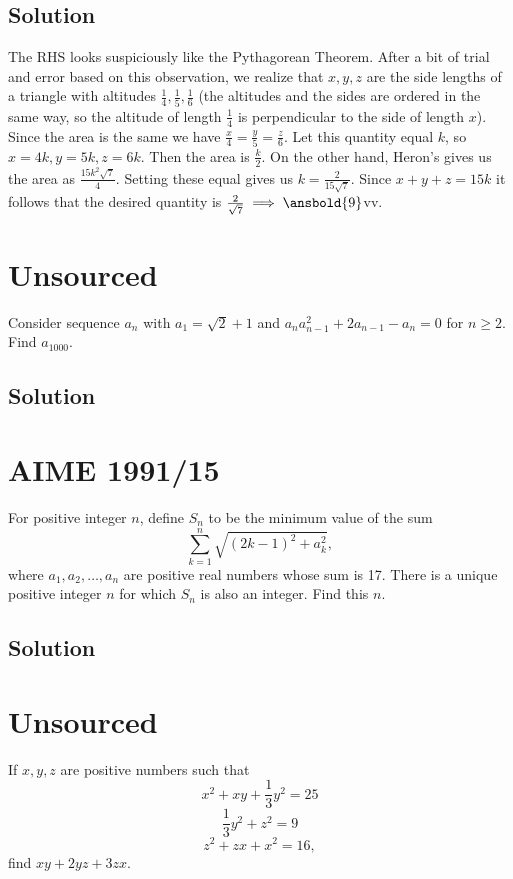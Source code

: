 \documentclass{article}
\begin{document}
\subsection{Solution}
The RHS looks suspiciously like the Pythagorean Theorem. After a bit of trial and error based on this observation, we realize that $x,y,z$ are the side lengths of a triangle with altitudes $\frac{1}{4},\frac{1}{5},\frac{1}{6}$ (the altitudes and the sides are ordered in the same way, so the altitude of length $\frac{1}{4}$ is perpendicular to the side of length $x$). Since the area is the same we have $\frac{x}{4}=\frac{y}{5}=\frac{z}{6}$. Let this quantity equal $k$, so $x=4k,y=5k,z=6k$. Then the area is $\frac{k}{2}$. On the other hand, Heron's gives us the area as $\frac{15k^2\sqrt{7}}{4}$. Setting these equal gives us $k=\frac{2}{15\sqrt{7}}$. Since $x+y+z=15k$ it follows that the desired quantity is $\frac{2}{\sqrt{7}} \implies \ansbold{9}$vv.

\pagebreak\section{Unsourced}
Consider sequence $a_n$ with $a_1=\sqrt{2}+1$ and $a_na_{n-1}^2+2a_{n-1}-a_n=0$ for $n\geq 2.$ Find $a_{1000}.$

\subsection{Solution}

\pagebreak\section{AIME 1991/15}
For positive integer $n$, define $S_n$ to be the minimum value of the sum\[ \sum_{k=1}^n \sqrt{(2k-1)^2+a_k^2}, \]where $a_1,a_2,\ldots,a_n$ are positive real numbers whose sum is 17. There is a unique positive integer $n$ for which $S_n$ is also an integer. Find this $n$.

\subsection{Solution}

\pagebreak\section{Unsourced}
If $x,y,z$ are positive numbers such that
    \[x^2+xy+\frac{1}{3}y^2=25\]
    \[\frac{1}{3}y^2+z^2=9\]
    \[z^2+zx+x^2=16,\]
    find $xy+2yz+3zx.$
\end{document}
